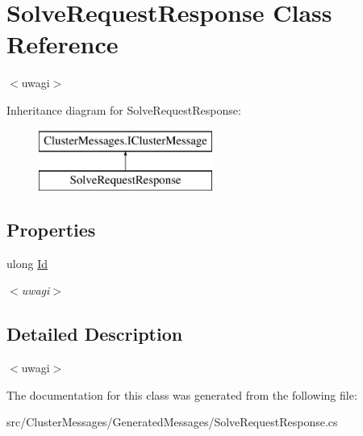 \hypertarget{class_solve_request_response}{}\section{Solve\+Request\+Response Class Reference}
\label{class_solve_request_response}


$<$uwagi$>$  


Inheritance diagram for Solve\+Request\+Response\+:\begin{figure}[H]
\begin{center}
\leavevmode
\includegraphics[height=2.000000cm]{class_solve_request_response}
\end{center}
\end{figure}
\subsection*{Properties}
\begin{DoxyCompactItemize}
\item 
\hypertarget{class_solve_request_response_a175bfa0656fa7e0aebe07a645fed5bf9}{}ulong \hyperlink{class_solve_request_response_a175bfa0656fa7e0aebe07a645fed5bf9}{Id}\label{class_solve_request_response_a175bfa0656fa7e0aebe07a645fed5bf9}

\begin{DoxyCompactList}\small\item\em $<$uwagi$>$ \end{DoxyCompactList}\end{DoxyCompactItemize}


\subsection{Detailed Description}
$<$uwagi$>$ 

The documentation for this class was generated from the following file\+:\begin{DoxyCompactItemize}
\item 
src/\+Cluster\+Messages/\+Generated\+Messages/Solve\+Request\+Response.\+cs\end{DoxyCompactItemize}
